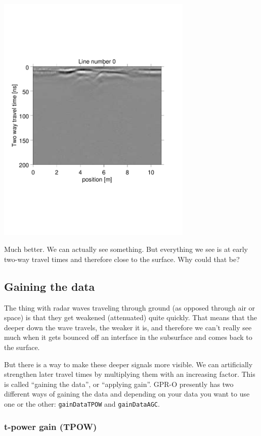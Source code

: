 \documentclass[11pt]{article}
\begin{document}
\begin{center}
\includegraphics[width=0.7\textwidth, trim = 0.9cm 6cm 2cm
  6.5cm,clip]{figures/GPRlineH0}
\end{center}
 
Much better. We can actually see something. But everything we see is
at early two-way travel times and therefore close to the surface. Why
could that be?

\subsection{Gaining the data}

The thing with radar waves traveling through ground (as opposed
through air or space) is that they get weakened (attenuated) quite
quickly. That means that the deeper down the wave travels, the weaker it
is, and therefore we can't really see much when it gets bounced off an
interface in the subsurface and comes back to the surface.
 
But there is a way to make these deeper signals more visible. We can
artificially strengthen later travel times by multiplying them with an
increasing factor. This is called ``gaining the data'', or ``applying
gain''. GPR-O presently has two different ways of gaining the data and
depending on your data you want to use one or the other:
\verb#gainDataTPOW# and \verb#gainDataAGC#.


\subsubsection{t-power gain (TPOW)}
\end{document}
